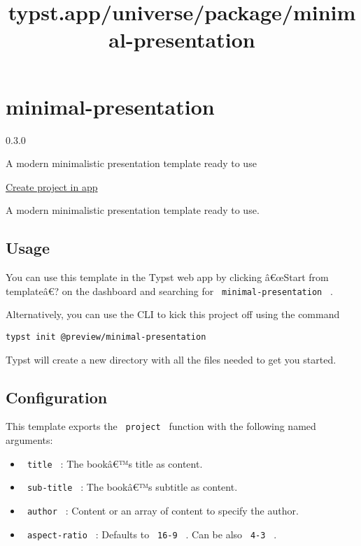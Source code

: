 \title{typst.app/universe/package/minimal-presentation}

\label{banner}
\label{template-thumbnail}

\section{minimal-presentation}\label{minimal-presentation}

{ 0.3.0 }

A modern minimalistic presentation template ready to use

\href{/app?template=minimal-presentation&version=0.3.0}{Create project
in app}

\label{readme}
A modern minimalistic presentation template ready to use.

\subsection{Usage}\label{usage}

You can use this template in the Typst web app by clicking â€œStart from
templateâ€? on the dashboard and searching for
\texttt{\ minimal-presentation\ } .

Alternatively, you can use the CLI to kick this project off using the
command

\begin{verbatim}
typst init @preview/minimal-presentation
\end{verbatim}

Typst will create a new directory with all the files needed to get you
started.

\subsection{Configuration}\label{configuration}

This template exports the \texttt{\ project\ } function with the
following named arguments:

\begin{itemize}
\tightlist
\item
  \texttt{\ title\ } : The bookâ€™s title as content.
\item
  \texttt{\ sub-title\ } : The bookâ€™s subtitle as content.
\item
  \texttt{\ author\ } : Content or an array of content to specify the
  author.
\item
  \texttt{\ aspect-ratio\ } : Defaults to \texttt{\ 16-9\ } . Can be
  also \texttt{\ 4-3\ } .
\end{itemize}

